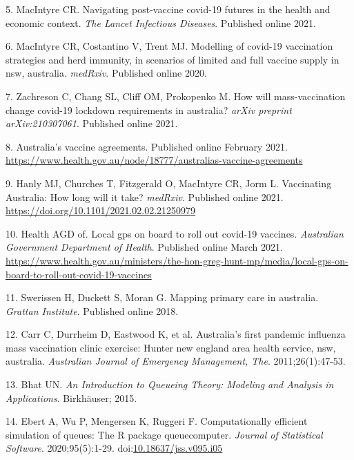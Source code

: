 \documentclass{article}
\begin{document}
\leavevmode\hypertarget{ref-macintyre2021navigating}{}%
5. MacIntyre CR. Navigating post-vaccine covid-19 futures in the health
and economic context. \emph{The Lancet Infectious Diseases}. Published
online 2021.

\leavevmode\hypertarget{ref-macintyre2020modelling}{}%
6. MacIntyre CR, Costantino V, Trent MJ. Modelling of covid-19
vaccination strategies and herd immunity, in scenarios of limited and
full vaccine supply in nsw, australia. \emph{medRxiv}. Published online
2020.

\leavevmode\hypertarget{ref-zachreson2021will}{}%
7. Zachreson C, Chang SL, Cliff OM, Prokopenko M. How will
mass-vaccination change covid-19 lockdown requirements in australia?
\emph{arXiv preprint arXiv:210307061}. Published online 2021.

\leavevmode\hypertarget{ref-vaccineAgreements}{}%
8. Australia's vaccine agreements. Published online February 2021.
\url{https://www.health.gov.au/node/18777/australias-vaccine-agreements}

\leavevmode\hypertarget{ref-hanly2021vaccinating}{}%
9. Hanly MJ, Churches T, Fitzgerald O, MacIntyre CR, Jorm L. Vaccinating
Australia: How long will it take? \emph{medRxiv}. Published online 2021.
\url{https://doi.org/10.1101/2021.02.02.21250979}

\leavevmode\hypertarget{ref-hunt2021local}{}%
10. Health AGD of. Local gps on board to roll out covid-19 vaccines.
\emph{Australian Government Department of Health}. Published online
March 2021.
\url{https://www.health.gov.au/ministers/the-hon-greg-hunt-mp/media/local-gps-on-board-to-roll-out-covid-19-vaccines}

\leavevmode\hypertarget{ref-swerissen2018mapping}{}%
11. Swerissen H, Duckett S, Moran G. Mapping primary care in australia.
\emph{Grattan Institute}. Published online 2018.

\leavevmode\hypertarget{ref-carr2011australia}{}%
12. Carr C, Durrheim D, Eastwood K, et al. Australia's first pandemic
influenza mass vaccination clinic exercise: Hunter new england area
health service, nsw, australia. \emph{Australian Journal of Emergency
Management, The}. 2011;26(1):47-53.

\leavevmode\hypertarget{ref-bhat2015introduction}{}%
13. Bhat UN. \emph{An Introduction to Queueing Theory: Modeling and
Analysis in Applications}. Birkhäuser; 2015.

\leavevmode\hypertarget{ref-queuecomputer2020}{}%
14. Ebert A, Wu P, Mengersen K, Ruggeri F. Computationally efficient
simulation of queues: The R package queuecomputer. \emph{Journal of
Statistical Software}. 2020;95(5):1-29.
doi:\href{https://doi.org/10.18637/jss.v095.i05}{10.18637/jss.v095.i05}
\end{document}
